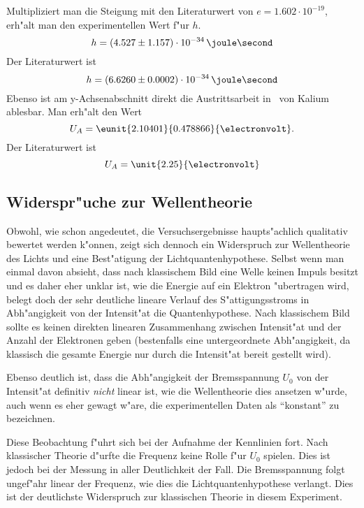 \documentclass[a4paper,10pt]{article}
\begin{document}
    Multipliziert man die Steigung mit den Literaturwert von $e = 1.602 \cdot
    10^{-19} $, erh"alt man den experimentellen Wert f"ur $h$.
    \begin{equation*}
      h = (4.527 \pm 1.157) \cdot 10^{-34}\,\joule\second
    \end{equation*}
    Der Literaturwert ist
    \begin{equation*}
      h = (6.6260 \pm 0.0002) \cdot 10^{-34}\,\joule\second
    \end{equation*}
    Ebenso ist am y-Achsenabschnitt direkt die Austrittsarbeit in \electronvolt\ von Kalium ablesbar. Man erh"alt den Wert
    \begin{equation*}
      U_A = \eunit{2.10401}{0.478866}{\electronvolt}.
    \end{equation*}
    Der Literaturwert ist
    \begin{equation*}
      U_A = \unit{2.25}{\electronvolt}
    \end{equation*}

  \subsection{Widerspr"uche zur Wellentheorie}
    Obwohl, wie schon angedeutet, die Versuchsergebnisse haupts"achlich qualitativ bewertet werden k"onnen, zeigt sich dennoch ein Widerspruch zur Wellentheorie des Lichts und eine Best"atigung der Lichtquantenhypothese. Selbst wenn man einmal davon absieht, dass nach klassischem Bild eine Welle keinen Impuls besitzt und es daher eher unklar ist, wie die Energie auf ein Elektron "ubertragen wird, belegt doch der sehr deutliche lineare Verlauf des S"attigungsstroms in Abh"angigkeit von der Intensit"at die Quantenhypothese. Nach klassischem Bild sollte es keinen direkten linearen Zusammenhang zwischen Intensit"at und der Anzahl der Elektronen geben (bestenfalls eine untergeordnete Abh"angigkeit, da klassisch die gesamte Energie nur durch die Intensit"at bereit gestellt wird).

    Ebenso deutlich ist, dass die Abh"angigkeit der Bremsspannung $U_0$ von der Intensit"at definitiv \emph{nicht} linear ist, wie die Wellentheorie dies ansetzen w"urde, auch wenn es eher gewagt w"are, die experimentellen Daten als ``konstant'' zu bezeichnen.

    Diese Beobachtung f"uhrt sich bei der Aufnahme der Kennlinien fort. Nach klassischer Theorie d"urfte die Frequenz keine Rolle f"ur $U_0$ spielen. Dies ist jedoch bei der Messung in aller Deutlichkeit der Fall. Die Bremsspannung folgt ungef"ahr linear der Frequenz, wie dies die Lichtquantenhypothese verlangt. Dies ist der deutlichste Widerspruch zur klassischen Theorie in diesem Experiment.
\end{document}

